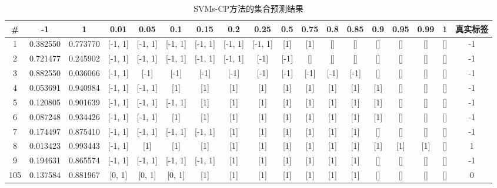 \begin{landscape}
\begin{table}[]
\centering
\caption{SVMs-CP方法的集合预测结果}
\label{tab:set-prediction-hfv}
\begin{tabular}{@{}cccccccccccccccccc@{}}
\toprule
\# & -1 & 1 & 0.01 & 0.05 & 0.1 & 0.15 & 0.2 & 0.25 & 0.5 & 0.75 & 0.8 & 0.85 & 0.9 & 0.95 & 0.99 & 1 & 真实标签 \\ \midrule
1 & 0.382550 & 0.773770 & {[}-1, 1{]} & {[}-1, 1{]} & {[}-1, 1{]} & {[}-1, 1{]} & {[}-1, 1{]} & {[}-1, 1{]} & {[}1{]} & {[}1{]} & {[}{]} & {[}{]} & {[}{]} & {[}{]} & {[}{]} & {[}{]} & -1 \\
2 & 0.721477 & 0.245902 & {[}-1, 1{]} & {[}-1, 1{]} & {[}-1, 1{]} & {[}-1, 1{]} & {[}-1, 1{]} & {[}-1{]} & {[}-1{]} & {[}{]} & {[}{]} & {[}{]} & {[}{]} & {[}{]} & {[}{]} & {[}{]} & -1 \\
3 & 0.882550 & 0.036066 & {[}-1, 1{]} & {[}-1{]} & {[}-1{]} & {[}-1{]} & {[}-1{]} & {[}-1{]} & {[}-1{]} & {[}-1{]} & {[}-1{]} & {[}-1{]} & {[}{]} & {[}{]} & {[}{]} & {[}{]} & -1 \\
4 & 0.053691 & 0.940984 & {[}-1, 1{]} & {[}-1, 1{]} & {[}1{]} & {[}1{]} & {[}1{]} & {[}1{]} & {[}1{]} & {[}1{]} & {[}1{]} & {[}1{]} & {[}1{]} & {[}{]} & {[}{]} & {[}{]} & -1 \\
5 & 0.120805 & 0.901639 & {[}-1, 1{]} & {[}-1, 1{]} & {[}-1, 1{]} & {[}1{]} & {[}1{]} & {[}1{]} & {[}1{]} & {[}1{]} & {[}1{]} & {[}1{]} & {[}1{]} & {[}{]} & {[}{]} & {[}{]} & -1 \\
6 & 0.087248 & 0.934426 & {[}-1, 1{]} & {[}-1, 1{]} & {[}1{]} & {[}1{]} & {[}1{]} & {[}1{]} & {[}1{]} & {[}1{]} & {[}1{]} & {[}1{]} & {[}1{]} & {[}{]} & {[}{]} & {[}{]} & -1 \\
7 & 0.174497 & 0.875410 & {[}-1, 1{]} & {[}-1, 1{]} & {[}-1, 1{]} & {[}-1, 1{]} & {[}1{]} & {[}1{]} & {[}1{]} & {[}1{]} & {[}1{]} & {[}1{]} & {[}{]} & {[}{]} & {[}{]} & {[}{]} & -1 \\
8 & 0.013423 & 0.993443 & {[}-1, 1{]} & {[}1{]} & {[}1{]} & {[}1{]} & {[}1{]} & {[}1{]} & {[}1{]} & {[}1{]} & {[}1{]} & {[}1{]} & {[}1{]} & {[}1{]} & {[}1{]} & {[}{]} & 1 \\
9 & 0.194631 & 0.865574 & {[}-1, 1{]} & {[}-1, 1{]} & {[}-1, 1{]} & {[}-1, 1{]} & {[}1{]} & {[}1{]} & {[}1{]} & {[}1{]} & {[}1{]} & {[}1{]} & {[}{]} & {[}{]} & {[}{]} & {[}{]} & -1 \\
105	&0.137584	&0.881967	&[0, 1]	&[0, 1]	&[0, 1]	&[1]	&[1]	&[1]	&[1]	&[1]	&[1]	&[1]	&[]	&[]	&[]	&[]	&0 \\

\end{tabular}
\end{table}
\end{landscape}
